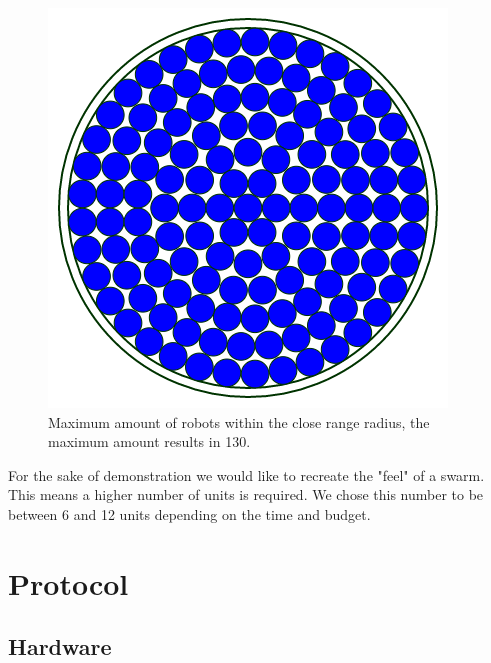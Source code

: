 \documentclass[10pt,a4paper]{article}
\begin{document}
\begin{figure}[H]
        \centering
        \graphicspath{ {./images/} }
        \includegraphics[scale=.6]{ccircle.png}
        \caption{Maximum amount of robots within the close range radius, the maximum amount results in 130.}
        \label{fig:ccircle}
\end{figure}



 For the sake of demonstration we would like to recreate the "feel" of a swarm. This means a higher number of units is required. We chose this number to be between 6 and 12 units depending on the time and budget. 

\begin{table}[h]
\centering
{}
\caption{Specifications number of units}
\label{specunits}
\end{table}
\newpage

\section{Protocol}
\subsection{Hardware}
\end{document}
